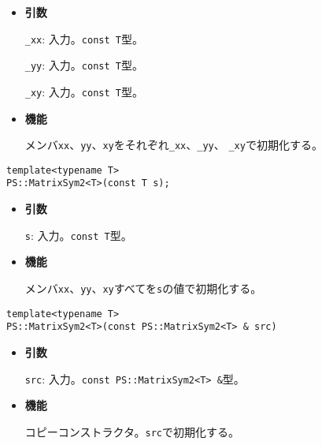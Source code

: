 \begin{itemize}

\item{{\bf 引数}}

{\tt \_xx}: 入力。{\tt const T}型。

{\tt \_yy}: 入力。{\tt const T}型。

{\tt \_xy}: 入力。{\tt const T}型。

\item{{\bf 機能}}

メンバ{\tt xx}、{\tt yy}、{\tt xy}をそれぞれ{\tt \_xx}、{\tt \_yy}、
{\tt \_xy}で初期化する。

\end{itemize}

\begin{screen}
\begin{verbatim}
template<typename T>
PS::MatrixSym2<T>(const T s);
\end{verbatim}
\end{screen}

\begin{itemize}

\item{{\bf 引数}}

{\tt s}: 入力。{\tt const T}型。

\item{{\bf 機能}}

メンバ{\tt xx}、{\tt yy}、{\tt xy}すべてを{\tt s}の値で初期化する。

\end{itemize}

\begin{screen}
\begin{verbatim}
template<typename T>
PS::MatrixSym2<T>(const PS::MatrixSym2<T> & src)
\end{verbatim}
\end{screen}

\begin{itemize}

\item{{\bf 引数}}

{\tt src}: 入力。{\tt const PS::MatrixSym2<T> \&}型。

\item{{\bf 機能}}

コピーコンストラクタ。{\tt src}で初期化する。

\end{itemize}


